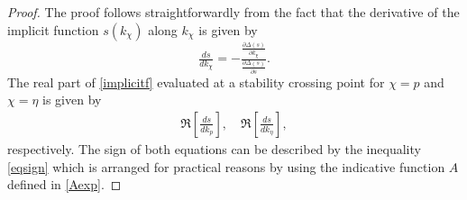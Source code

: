 \documentclass[twoside,reqno,11pt]{fcaa-var} %
\begin{document}
\begin{proof}
	The proof follows straightforwardly from the fact that the derivative of the implicit function $s(k_\chi)$ along $k_\chi$ is given by
	\begin{equation}
	\tfrac{ds}{dk_\chi}=-\tfrac{\frac{\partial \Delta(s)}{\partial k_\chi}}{\frac{\partial\Delta(s)}{\partial s}}. \label{implicitf}
	\end{equation}
The real part of \eqref{implicitf} evaluated at a stability crossing point for $\chi=p$ and $\chi=\eta$ is given by
	\begin{eqnarray}
	\Re\left[\tfrac{ds}{dk_p}\right], \quad
	\Re\left[\tfrac{ds}{dk_\eta}\right],
	\end{eqnarray}
	respectively. The sign of both equations can be described by the inequality \eqref{eqsign} which is arranged for practical reasons by using the indicative function $A$ defined in \eqref{Aexp}.
\end{proof}
\end{document}
